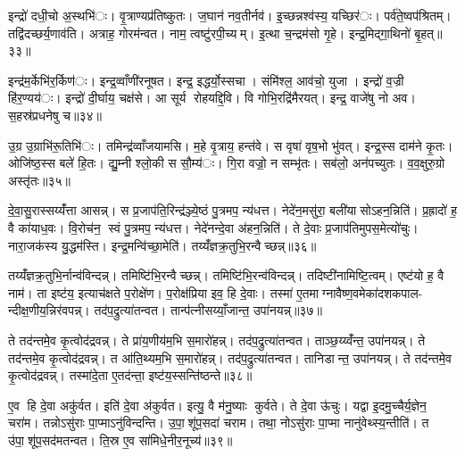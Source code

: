 
इन्द्रो॑ दधी॒चो अ॒स्थभि॑ः। वृ॒त्राण्यप्र॑तिष्कुतः। ज॒घान॑ नव॒तीर्नव॑। इ॒च्छन्नश्व॑स्य॒ यच्छिर॑ः। पर्व॑ते॒ष्वप॑श्रितम्। तद्वि॑दच्छर्य॒णाव॑ति। अत्राह॒ गोरम॑न्वत। नाम॒ त्वष्टु॑रपी॒च्यम्। इ॒त्था च॒न्द्रम॑सो गृ॒हे। इन्द्र॒मिद्गा॒थिनो॑ बृ॒हत्॥३३॥

इन्द्र॑म॒र्केभि॑र॒र्किण॑ः। इन्द्र॒व्वाँणी॑रनूषत। इन्द्र॒ इद्धर्यो॒स्सचा। संमि॑श्ल॒ आव॑चो॒ युजा। इन्द्रो॑ व॒ज्री हि॑र॒ण्यय॑ः। इन्द्रो॑ दी॒र्घाय॒ चक्ष॑से। आ सूर्य रोहयद्दि॒वि। वि गोभि॒रद्रि॑मैरयत्। इन्द्र॒ वाजे॑षु नो अव। स॒हस्र॑प्रधनेषु च॥३४॥

उ॒ग्र उ॒ग्राभि॑रू॒तिभि॑ः। तमिन्द्र॑व्वाँजयामसि। म॒हे वृ॒त्राय॒ हन्त॑वे। स वृषा॑ वृष॒भो भु॑वत्। इन्द्र॒स्स दाम॑ने कृ॒तः। ओजि॑ष्ठ॒स्स बले॑ हि॒तः। द्यु॒म्नी श्लो॒की स सौ॒म्य॑ः। गि॒रा वज्रो॒ न सम्भृ॑तः। सब॑लो॒ अन॑पच्युतः। व॒व॒क्षुरु॒ग्रो अस्तृ॑तः॥३५॥


दे॒वा॒सु॒रास्सय्यँ॑त्ता आसन्न्। स प्र॒जाप॑ति॒रिन्द्र॑ञ्ज्ये॒ष्ठं पु॒त्रमप॒ न्य॑धत्त। नेदे॑न॒मसु॑रा॒ बली॑यासोऽहन॒न्निति॑। प्र॒ह्रादो॑ ह॒ वै का॑याध॒वः। वि॒रोच॑न॒ स्वं पु॒त्रमप॒ न्य॑धत्त। नेदे॑नन्दे॒वा अ॑हन॒न्निति॑। ते दे॒वाः प्र॒जाप॑तिमुपस॒मेत्यो॑चुः। नारा॒जक॑स्य यु॒द्धम॑स्ति। इन्द्र॒मन्वि॑च्छा॒मेति॑। तय्यँ॑ज्ञक्र॒तुभि॒रन्वैच्छन्न्॥३६॥

तय्यँ॑ज्ञक्र॒तुभि॒र्नान्व॑विन्दन्न्। तमिष्टि॑भि॒रन्वैच्छन्न्। तमिष्टि॑भि॒रन्व॑विन्दन्न्। तदिष्टी॑नामिष्टि॒त्वम्। एष्ट॑यो ह॒ वै नाम॑। ता इष्ट॑य॒ इत्याच॑क्षते प॒रोक्षे॑ण। प॒रोक्ष॑प्रिया इव॒ हि दे॒वाः। तस्मा॑ ए॒तमाग्नावैष्ण॒वमेका॑दशकपाल- न्दीक्ष॒णीय॒न्निर॑वपन्न्। तद॑प॒द्रुत्या॑तन्वत। तान्प॑त्नीसय्याँ॒जान्त॒ उपा॑नयन्न्॥३७॥

ते तद॑न्तमे॒व कृ॒त्वोद॑द्रवन्न्। ते प्रा॑य॒णीय॑म॒भि स॒मारो॑हन्न्। तद॑प॒द्रुत्या॑तन्वत। ताञ्छ॒य्य्वँ॑न्त॒ उपा॑नयन्न्। ते तद॑न्तमे॒व कृ॒त्वोद॑द्रवन्न्। त आ॑ति॒थ्यम॒भि स॒मारो॑हन्न्। तद॑प॒द्रुत्या॑तन्वत। तानिडान्त॒ उपा॑नयन्न्। ते तद॑न्तमे॒व कृ॒त्वोद॑द्रवन्न्। तस्मा॑दे॒ता ए॒तद॑न्ता॒ इष्ट॑य॒स्सन्ति॑ष्ठन्ते॥३८॥

ए॒व हि दे॒वा अकु॑र्वत। इति॑ दे॒वा अ॑कुर्वत। इत्यु॒ वै म॑नु॒ष्याः कुर्वते। ते दे॒वा ऊ॑चुः। यद्वा इ॒दमु॒च्चैर्य॒ज्ञेन॒ चरा॑म। तन्नोऽसु॑राः पा॒प्माऽनु॑विन्दन्ति। उ॒पा॒शू॑प॒सदा॑ चराम। तथा॒ नोऽसु॑राः पा॒प्मा नानु॑वेथ्स्य॒न्तीति॑। त उ॑पा॒शू॑प॒सद॑मतन्वत। ति॒स्र ए॒व सा॑मिधे॒नीर॒नूच्य॑॥३९॥

